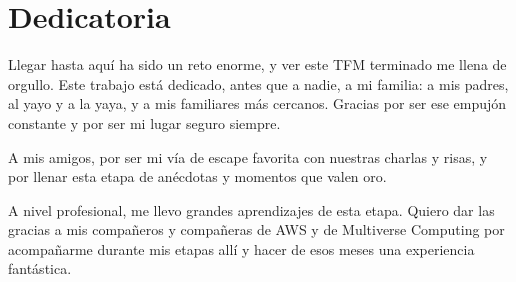 \documentclass[12pt]{report} %
\makeatletter
\DeclareRobustCommand{\texttt}[1]{{%
    \fontsize{\dimexpr\f@size pt*9/10\relax}{\f@baselineskip}\selectfont
    \oldtexttt{#1}}}
\renewcommand{\_}{\origunderscore\allowbreak}
\makeatother
\begin{document}
\begin{abstract}
    El empaquetado no eleva el acuerdo por sí mismo. Solo \texttt{gemini-3.1-flash-lite} obtiene una ganancia de entidad, en \texttt{masc\_generico}, donde su recall pasa de 0,287 a 0,733, de modo que la arquitectura amplifica la capacidad que cada modelo ya posee en lugar de conferirla. La elección del modelo pesa más que la de la configuración, y la recuperación en vivo no aporta una ganancia que justifique su coste. El desajuste con la anotación experta responde a dos causas: un techo de la tarea en la variable cuyo criterio no llega a estabilizarse, donde dos personas del mismo equipo la marcan con un 28,3\,\% y un 97,8\,\% de prevalencia, y una infradetección de los modelos que detectan aún menos piezas que las expertas que menos localizan. El modelo local compite variable a variable con los proporcionados comercialmente y los supera en asimetría entre mujeres y hombres, sin coste por uso y preservando la privacidad del material. El sistema resulta más adecuado como asistente que como decisor, y la validación del plano cualitativo queda como principal línea futura.

	\textbf{Palabras Clave:}
     \textit{Sesgos de género, Inteligencia Artificial, Agent Skills, Agentes especializadas, Grandes Modelos de Lenguaje, Persona en el bucle.}
	
	\vfill
\end{abstract}
	\newpage %
	\thispagestyle{empty}
	\mbox{}


\chapter*{Dedicatoria}

\setcounter{page}{5}
	
Llegar hasta aquí ha sido un reto enorme, y ver este TFM terminado me llena de orgullo. Este trabajo está dedicado, antes que a nadie, a mi familia: a mis padres, al yayo y a la yaya, y a mis familiares más cercanos. Gracias por ser ese empujón constante y por ser mi lugar seguro siempre.

A mis amigos, por ser mi vía de escape favorita con nuestras charlas y risas, y por llenar esta etapa de anécdotas y momentos que valen oro.

A nivel profesional, me llevo grandes aprendizajes de esta etapa. Quiero dar las gracias a mis compañeros y compañeras de AWS y de Multiverse Computing por acompañarme durante mis etapas allí y hacer de esos meses una experiencia fantástica.
\end{document}
